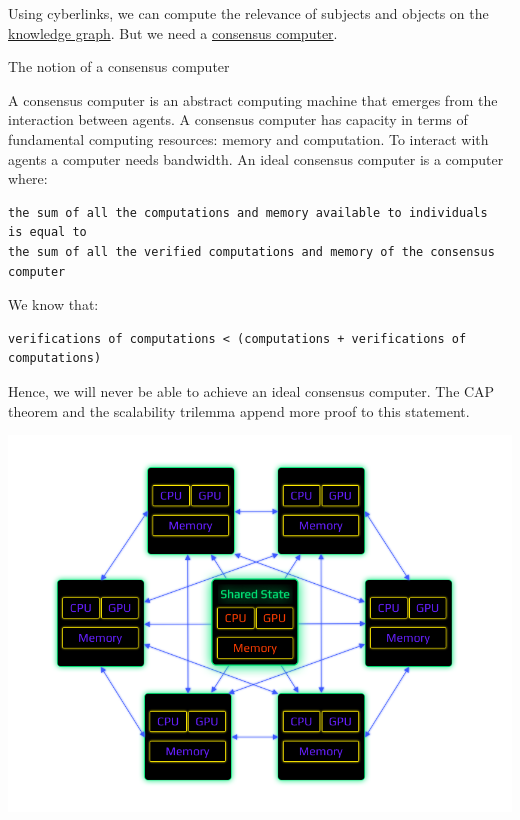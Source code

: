 \documentclass[8pt,oneside]{amsart}
\makeatletter
\renewcommand\subsection{\@startsection{subsection}
                                    {2}{\z@}
                                    {-3.25ex\@plus -1ex \@minus -.2ex}
                                    {0ex \@plus .2ex}
                                    {\play\Large}
                        }
\newcommand{\titleSection}[1]{\subsection{#1}}
\newenvironment{Figure}
  {\par\medskip\noindent\minipage{\linewidth}}
  {\endminipage\par\medskip}
\makeatother
\begin{document}
Using cyberlinks, we can compute the relevance of subjects and objects on the {\hyperref[knowledge-graph]{knowledge graph}}. But we need a {\hyperref[consensus-computer]{consensus computer}}.

\titleSection{The notion of a consensus computer}\label{consensus-computer}

A consensus computer is an abstract computing machine that emerges from the interaction between agents. A consensus computer has capacity in terms of fundamental computing resources: memory and computation. To interact with agents a computer needs bandwidth. An ideal consensus computer is a computer where:
\\
\begin{lstlisting}
the sum of all the computations and memory available to individuals
is equal to
the sum of all the verified computations and memory of the consensus computer
\end{lstlisting}

We know that:
\begin{lstlisting}
verifications of computations < (computations + verifications of computations)
\end{lstlisting}

Hence, we will never be able to achieve an ideal consensus computer. The CAP theorem and the scalability trilemma append more proof to this statement.
\begin{Figure}
    \centering
    \includegraphics[width=1\textwidth]{consensus-computer.png}
\end{Figure}
\end{document}
